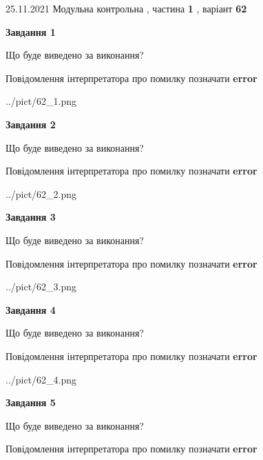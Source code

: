 \documentclass[10pt, ukrainian]{article}
\begin{document}
{25.11.2021 Модульна контрольна , частина \textbf { 1 }, варіант  \No \textbf { 62 }\par}
{
\begin {large}

{\begin {center}\textbf{Завдання 1}\end {center}}\par
Що буде виведено за виконання? \par
Повідомлення інтерпретатора про помилку позначати \textbf{error}

\begin{center}
	{../pict/62_1.png}
\end{center}
\newpage

{\begin {center}\textbf{Завдання 2}\end {center}}\par
Що буде виведено за виконання? \par
Повідомлення інтерпретатора про помилку позначати \textbf{error}

\begin{center}
	{../pict/62_2.png}
\end{center}
\newpage

{\begin {center}\textbf{Завдання 3}\end {center}}\par
Що буде виведено за виконання? \par
Повідомлення інтерпретатора про помилку позначати \textbf{error}

\begin{center}
	{../pict/62_3.png}
\end{center}
\newpage

{\begin {center}\textbf{Завдання 4}\end {center}}\par
Що буде виведено за виконання? \par
Повідомлення інтерпретатора про помилку позначати \textbf{error}

\begin{center}
	{../pict/62_4.png}
\end{center}
\newpage

{\begin {center}\textbf{Завдання 5}\end {center}}\par
Що буде виведено за виконання? \par
Повідомлення інтерпретатора про помилку позначати \textbf{error}


\end{large}}
\end{document}
